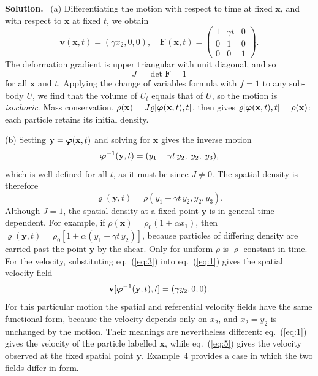 \documentclass[a4paper,12pt]{paper}
\newcounter{example}
\newenvironment{solution}{\par\noindent\textbf{Solution.}\ }{\par\medskip}
\begin{document}
\begin{solution}
(a) Differentiating the motion with respect to time at fixed $\mathbf{x}$, and with respect to
$\mathbf{x}$ at fixed $t$, we obtain
\begin{equation}
\mathbf{v}(\mathbf{x},t)=(\gamma x_{2},0,0),\quad
\mathbf{F}(\mathbf{x},t)=\begin{pmatrix}1&\gamma t&0\\0&1&0\\0&0&1\end{pmatrix}.
\label{eq:1}
\end{equation}
The deformation gradient is upper triangular with unit diagonal, and so
\begin{equation}
J=\det\mathbf{F}=1
\label{eq:2}
\end{equation}
for all $\mathbf{x}$ and $t$. Applying the change of variables formula with $f=1$ to any
sub-body $U$, we find that the volume of $U_{t}$ equals that of $U$, so the motion is
\emph{isochoric}. Mass conservation, $\rho(\mathbf{x})=J\varrho[\bm{\varphi}(\mathbf{x},t),t]$, then
gives $\varrho[\bm{\varphi}(\mathbf{x},t),t]=\rho(\mathbf{x})$: each particle retains its initial
density.

(b) Setting $\mathbf{y}=\bm{\varphi}(\mathbf{x},t)$ and solving for $\mathbf{x}$ gives the inverse
motion
\begin{equation}
\bm{\varphi}^{-1}(\mathbf{y},t)=(y_{1}-\gamma t\,y_{2},\;y_{2},\;y_{3}),
\label{eq:3}
\end{equation}
which is well-defined for all $t$, as it must be since $J\neq0$. The spatial density is
therefore
\begin{equation}
\varrho(\mathbf{y},t)=\rho(y_{1}-\gamma t\,y_{2},y_{2},y_{3}).
\label{eq:4}
\end{equation}
Although $J=1$, the spatial density at a fixed point $\mathbf{y}$ is in general
time-dependent. For example, if $\rho(\mathbf{x})=\rho_{0}(1+\alpha x_{1})$, then
$\varrho(\mathbf{y},t)=\rho_{0}[1+\alpha(y_{1}-\gamma t\,y_{2})]$, because particles of
differing density are carried past the point $\mathbf{y}$ by the shear. Only for uniform
$\rho$ is $\varrho$ constant in time. For the velocity, substituting eq.~(\ref{eq:3}) into
eq.~(\ref{eq:1}) gives the spatial velocity field
\begin{equation}
\mathbf{v}[\bm{\varphi}^{-1}(\mathbf{y},t),t]=(\gamma y_{2},0,0).
\label{eq:5}
\end{equation}
For this particular motion the spatial and referential velocity fields have the same functional
form, because the velocity depends only on $x_{2}$, and $x_{2}=y_{2}$ is unchanged by the
motion. Their meanings are nevertheless different: eq.~(\ref{eq:1}) gives the velocity of the
particle labelled $\mathbf{x}$, while eq.~(\ref{eq:5}) gives the velocity observed at the fixed
spatial point $\mathbf{y}$. Example~4 provides a case in which the two fields differ in form.


\end{solution}
\end{document}
